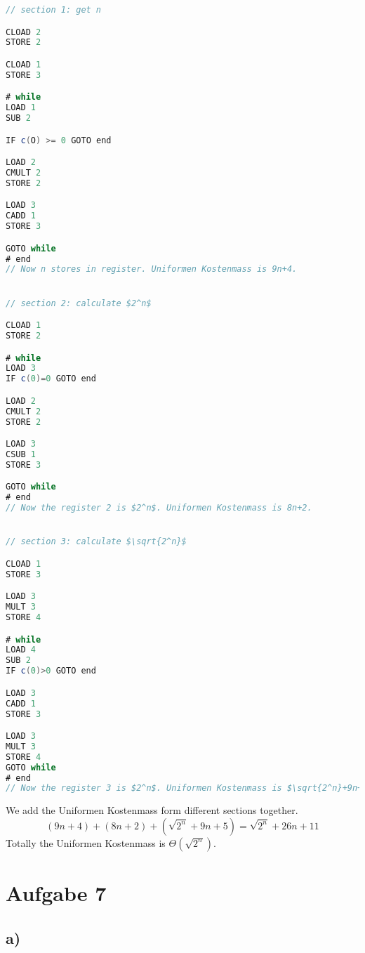 \documentclass[a4paper,11pt]{scrartcl}
\begin{document}
\begin{lstlisting}[language=java, mathescape=true]
// section 1: get n

CLOAD 2
STORE 2

CLOAD 1
STORE 3

# while
LOAD 1
SUB 2

IF c(O) >= 0 GOTO end

LOAD 2
CMULT 2
STORE 2

LOAD 3
CADD 1
STORE 3

GOTO while
# end
// Now n stores in register. Uniformen Kostenmass is 9n+4.


// section 2: calculate $2^n$

CLOAD 1
STORE 2

# while
LOAD 3
IF c(0)=0 GOTO end

LOAD 2
CMULT 2
STORE 2

LOAD 3
CSUB 1
STORE 3

GOTO while
# end
// Now the register 2 is $2^n$. Uniformen Kostenmass is 8n+2.


// section 3: calculate $\sqrt{2^n}$

CLOAD 1
STORE 3

LOAD 3
MULT 3
STORE 4

# while
LOAD 4
SUB 2
IF c(0)>0 GOTO end

LOAD 3
CADD 1
STORE 3

LOAD 3
MULT 3
STORE 4
GOTO while
# end
// Now the register 3 is $2^n$. Uniformen Kostenmass is $\sqrt{2^n}+9n+5$.
\end{lstlisting}

We add the Uniformen Kostenmass form different sections together.
$$
(9n+4)+(8n+2)+(\sqrt{2^n}+9n+5) = \sqrt{2^n} + 26n + 11
$$
Totally the Uniformen Kostenmass is $\Theta (\sqrt{2^n})$.

\section*{Aufgabe 7}

\subsection*{a)}
\end{document}
